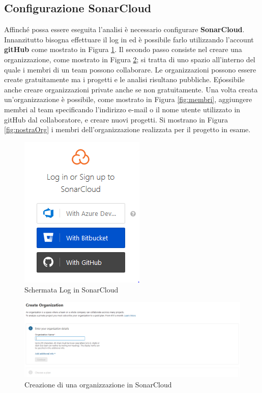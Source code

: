 \subsection{Configurazione SonarCloud}
Affinché possa essere eseguita l'analisi è necessario configurare \textbf{SonarCloud}. Innanzitutto bisogna effettuare il log in ed è possibile farlo utilizzando l'account \textbf{gitHub} come mostrato in Figura \ref{fig:login}. Il secondo passo consiste nel creare una organizzazione, come mostrato in Figura \ref{fig:organizzazione}; si tratta di uno spazio all'interno del quale i membri di un team possono collaborare. Le organizzazioni possono essere create gratuitamente ma i progetti e le analisi risultano pubbliche. E\' possibile anche creare organizzazioni private anche se non gratuitamente. Una volta creata un'organizzazione è possibile, come mostrato in Figura \ref{fig:membri}, aggiungere membri al team specificando l'indirizzo e-mail o il nome utente utilizzato in gitHub dal collaboratore, e creare nuovi progetti. Si mostrano in Figura \ref{fig:nostraOrg} i membri dell'organizzazione realizzata per il progetto in esame.
\begin{figure}[htbp]
	\centering
	\includegraphics[scale=0.5, trim = 0cm 0cm 0cm 0cm, clip=true]{figSonarCloud/figLogInSonar.PNG}
	\caption{Schermata Log in SonarCloud}
	\label{fig:login}
\end{figure}

\begin{figure}[htbp]
	\centering
	\includegraphics[scale=0.5, trim = 0cm 0cm 0cm 0cm, clip=true]{figSonarCloud/organizzazione.PNG}
	\caption{Creazione di una organizzazione in SonarCloud}
	\label{fig:organizzazione}
\end{figure}

